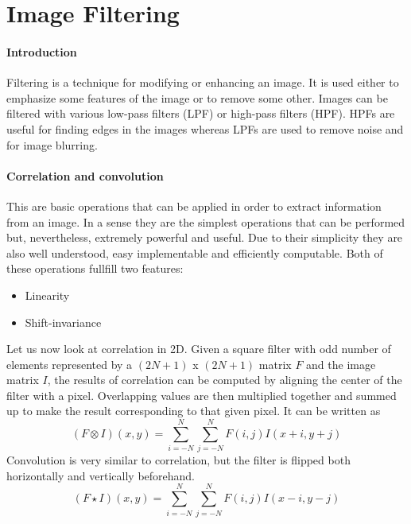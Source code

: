 \section{Image Filtering}
\paragraph{Introduction}
Filtering is a technique for modifying or enhancing an image. It is used either to emphasize some features of the image or to remove some other. Images can be filtered with various low-pass filters (LPF) or high-pass filters (HPF). HPFs are useful for finding edges in the images whereas LPFs are used to remove noise and for image blurring.

\paragraph{Correlation and convolution}\cite{correlation-convolution}
This are basic operations that can be applied in order to extract information from an image. In a sense they are the simplest operations that can be performed but, nevertheless, extremely powerful and useful. Due to their simplicity they are also well understood, easy implementable and efficiently computable. Both of these operations fullfill two features:
\begin{itemize}
	\item Linearity
	\item Shift-invariance
\end{itemize}
Let us now look at correlation in 2D. Given a square filter with odd number of elements represented by a $(2N + 1)$ x $(2N + 1)$ matrix $F$ and the image matrix $I$, the results of correlation can be computed by aligning the center of the filter with a pixel. Overlapping values are then multiplied together and summed up to make the result corresponding to that given pixel. It can be written as
\begin{equation}
	(F \otimes I)(x, y) = \sum_{i = -N}^{N}\sum_{j = -N}^{N}F(i, j)I(x + i, y + j)
\end{equation}
Convolution is very similar to correlation, but the filter is flipped both horizontally and vertically beforehand. 
\begin{equation}
	(F \star I)(x, y) = \sum_{i = -N}^{N}\sum_{j = -N}^{N}F(i, j)I(x - i, y - j)
\end{equation}


